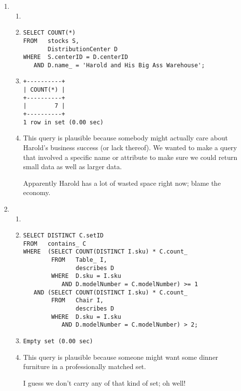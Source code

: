 \documentclass[american,extrafontsizes,12pt,portrait,letterpaper,oneside,onecolumn,article,final]{memoir}
\begin{document}
\begin{enumerate}[leftmargin=*,label={\strong{\uline{(\emph{\Alph*})}}}]
\item
\begin{enumerate}[leftmargin=*,widest={\strong{Explanation:}}]
\item[\strong{Intent:}] 
\item[\strong{Query:}]
\begin{verbatim}
SELECT COUNT(*)
FROM   stocks S,
       DistributionCenter D
WHERE  S.centerID = D.centerID
   AND D.name_ = 'Harold and His Big Ass Warehouse';
\end{verbatim}
\item[\strong{Result:}]
\begin{verbatim}
+----------+
| COUNT(*) |
+----------+
|        7 |
+----------+
1 row in set (0.00 sec)
\end{verbatim}
\item[\strong{Explanation:}] This query is plausible because somebody might actually care about Harold's business success (or lack thereof).
We wanted to make a query that involved a specific name or attribute to make sure we could return small data as well as larger data.

Apparently Harold has a lot of wasted space right now; blame the economy.
\end{enumerate}

\item
\begin{enumerate}[leftmargin=*,widest={\strong{Explanation:}}]
\item[\strong{Intent:}] 
\item[\strong{Query:}]
\begin{verbatim}
SELECT DISTINCT C.setID
FROM   contains_ C
WHERE  (SELECT COUNT(DISTINCT I.sku) * C.count_
        FROM   Table_ I,
               describes D
        WHERE  D.sku = I.sku
           AND D.modelNumber = C.modelNumber) >= 1
   AND (SELECT COUNT(DISTINCT I.sku) * C.count_
        FROM   Chair I,
               describes D
        WHERE  D.sku = I.sku
           AND D.modelNumber = C.modelNumber) > 2;
\end{verbatim}
\item[\strong{Result:}]
\begin{verbatim}
Empty set (0.00 sec)
\end{verbatim}
\item[\strong{Explanation:}] This query is plausible because someone might want some dinner furniture in a professionally matched set.

I guess we don't carry any of that kind of set; oh well!
\end{enumerate}

\end{enumerate}
\end{document}
